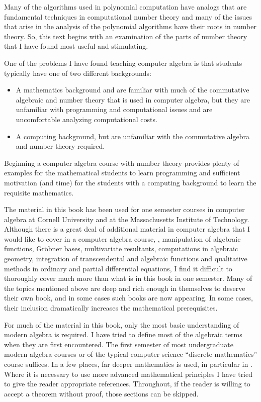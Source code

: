 Many of the algorithms used in polynomial computation have analogs
that are fundamental techniques in computational number theory and
many of the issues that arise in the analysis of the polynomial
algorithms have their roots in number theory.  So, this text begins
with an examination of the parts of number theory that I have found
most useful and stimulating.

One of the problems I have found teaching computer algebra is that
students typically have one of two different backgrounds:
\begin{itemize}
\item A mathematics background and are familiar with much of the
commutative algebraic and number theory that is used in computer
algebra, but they are unfamiliar with programming and computational
issues and are uncomfortable analyzing computational costs.
\item A computing background, but are unfamiliar with the commutative
algebra and number theory required. 
\end{itemize}
Beginning a computer algebra course with number theory provides plenty
of examples for the mathematical students to learn programming and
sufficient motivation (and time) for the students with a computing
background to learn the requisite mathematics.

The material in this book has been used for one semester courses in
computer algebra at Cornell University and at the Massachusetts
Institute of Technology.  Although there is a great deal of additional
material in computer algebra that I would like to cover in a computer
algebra course, \eg, manipulation of algebraic functions, Gr\"{o}bner
bases, multivariate resultants, computations in algebraic geometry,
integration of transcendental and algebraic functions and qualitative
methods in ordinary and partial differential equations, I find it
difficult to thoroughly cover much more than what is in this book in
one semester.  Many of the topics mentioned above are deep and rich
enough in themselves to deserve their own book, and in some cases such
books are now appearing.  In some cases, their inclusion dramatically
increases the mathematical prerequisites.

For much of the material in this book, only the most basic
understanding of modern algebra is required.  I have tried to define
most of the algebraic terms when they are first encountered.  The first
semester of most undergraduate modern algebra courses or of the
typical computer science ``discrete mathematics'' course suffices.  In
a few places, far deeper mathematics is used, in particular in
.  Where it is necessary to use more
advanced mathematical principles I have tried to give the reader
appropriate references.  Throughout, if the reader is willing to
accept a theorem without proof, those sections can be skipped.


